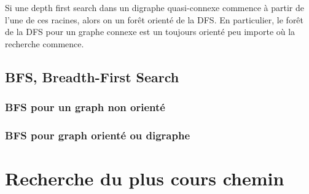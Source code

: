 \begin{theorem}
	Si une depth first search dans un digraphe quasi-connexe commence à partir de l'une de ces racines, alors on un forêt orienté de la DFS. En particulier, le forêt de la DFS pour un graphe connexe est un toujours orienté peu importe où la recherche commence.
\end{theorem}

\subsection{BFS, Breadth-First Search}
\subsubsection{BFS pour un graph non orienté}



\subsubsection{BFS pour graph orienté ou digraphe}


\section{Recherche du plus cours chemin}








 
 
